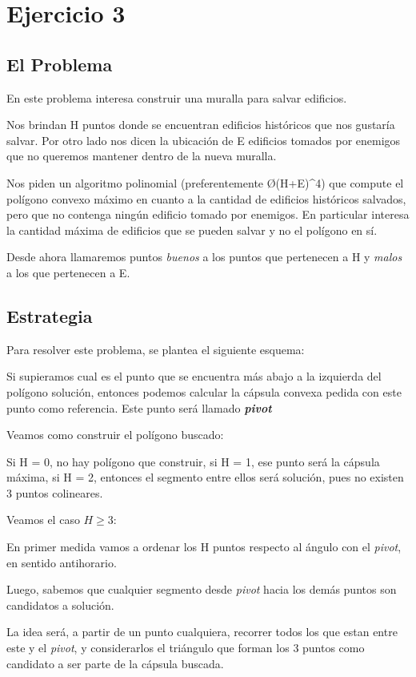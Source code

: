 \section{Ejercicio 3}
\subsection{El Problema}
En este problema interesa construir una muralla para salvar edificios.

Nos brindan H puntos donde se encuentran edificios históricos que nos gustaría salvar. Por otro lado nos dicen la ubicación de E edificios tomados por enemigos que no queremos mantener dentro de la nueva muralla.

Nos piden un algoritmo polinomial (preferentemente \O{(H+E)^4}) que compute el polígono convexo máximo en cuanto a la cantidad de edificios históricos salvados, pero que no contenga ningún edificio tomado por enemigos. En particular interesa la cantidad máxima de edificios que se pueden salvar y no el polígono en sí.

Desde ahora llamaremos puntos \textit{buenos} a los puntos que pertenecen a H y \textit{malos} a los que pertenecen a E.

\subsection{Estrategia}
Para resolver este problema, se plantea el siguiente esquema:

Si supieramos cual es el punto que se encuentra más abajo a la izquierda del polígono solución, entonces podemos calcular la cápsula convexa pedida con este punto como referencia. Este punto será llamado \textit{\textbf{pivot}}

Veamos como construir el polígono buscado:

Si H = 0, no hay polígono que construir, si H = 1, ese punto será la cápsula máxima, si H = 2, entonces el segmento entre ellos será solución, pues no existen 3 puntos colineares.

Veamos el caso $H \geq 3$:

En primer medida vamos a ordenar los H puntos respecto al ángulo con el \textit{pivot}, en sentido antihorario.

Luego, sabemos que cualquier segmento desde \textit{pivot} hacia los demás puntos son candidatos a solución.

La idea será, a partir de un punto cualquiera, recorrer todos los que estan entre este y el \textit{pivot}, y considerarlos el triángulo que forman los 3 puntos como candidato a ser parte de la cápsula buscada.

